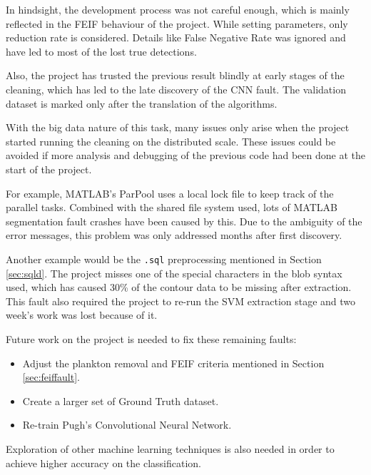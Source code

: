 \documentclass[bsc,logo,twoside,fullspacing,parskip]{infthesis}
\begin{document}
In hindsight, the development process was not careful enough, which is mainly reflected in the FEIF behaviour of the project. 
While setting parameters, only reduction rate is considered. 
Details like False Negative Rate was ignored and have led to most of the lost true detections.

Also, the project has trusted the previous result blindly at early stages of the cleaning, which has led to the late discovery of the CNN fault.
The validation dataset is marked only after the translation of the algorithms.

With the big data nature of this task, many issues only arise when the project started running the cleaning on the distributed scale.
These issues could be avoided if more analysis and debugging of the previous code had been done at the start of the project.

For example, MATLAB's ParPool uses a local lock file to keep track of the parallel tasks. 
Combined with the shared file system used, lots of MATLAB segmentation fault crashes have been caused by this. 
Due to the ambiguity of the error messages, this problem was only addressed months after first discovery.

Another example would be the {\tt .sql} preprocessing mentioned in Section \ref{sec:sqld}.
The project misses one of the special characters in the blob syntax used, which has caused 30\% of the contour data to be missing after extraction.
This fault also required the project to re-run the SVM extraction stage and two week's work was lost because of it.

Future work on the project is needed to fix these remaining faults:
\begin{itemize}
\setlength{\parskip}{0pt}
\item Adjust the plankton removal and FEIF criteria mentioned in Section \ref{sec:feiffault}.
\item Create a larger set of Ground Truth dataset.
\item Re-train Pugh's Convolutional Neural Network.
\end{itemize}
 
Exploration of other machine learning techniques is also needed in order to achieve higher accuracy on the classification. 

\let\OLDthebibliography\thebibliography
\renewcommand\thebibliography[1]{
  \OLDthebibliography{#1}
  \setlength{\parskip}{0pt}
  \setlength{\itemsep}{5pt plus 0.3ex}
}



\end{document}
